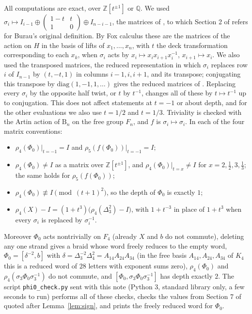 \documentclass[11pt]{amsart}
\theoremstyle{remark}
\newcommand{\B}{\mathrm{B}}
\newcommand{\at}{\big|_{t=-1}}
\begin{document}
All computations are exact, over $\mathbb{Z}[t^{\pm1}]$ or $\mathbb{Q}$. We used $\sigma_i\mapsto I_{i-1}\oplus\begin{pmatrix}1-t&t\\1&0\end{pmatrix}\oplus I_{n-i-1}$, the matrices of \cite[Section 4.2]{BB05}, to which Section 2 of \cite{BBB} refers for Burau's original definition. By Fox calculus these are the matrices of the action on $H$ in the basis of lifts of $x_1,\dots,x_n$, with $t$ the deck transformation corresponding to each $x_k$, when $\sigma_i$ acts by $x_i\mapsto x_ix_{i+1}x_i^{-1}$, $x_{i+1}\mapsto x_i$. We also used the transposed matrices, the reduced representation in which $\sigma_i$ replaces row $i$ of $I_{n-1}$ by $(t,-t,1)$ in columns $i-1,i,i+1$, and its transpose; conjugating this transpose by $\mathrm{diag}(1,-1,1,\dots)$ gives the reduced matrices of \cite[Section 4.2]{BB05}. Replacing every $\sigma_i$ by the opposite half twist, or $t$ by $t^{-1}$, changes all of these by $t\mapsto t^{-1}$ up to conjugation. This does not affect statements at $t=-1$ or about depth, and for the other evaluations we also use $t=1/2$ and $t=1/3$. Triviality is checked with the Artin action of $\B_n$ on the free group $F_n$, and $f$ is $\sigma_i\mapsto\sigma_i$. In each of the four matrix conventions:
\begin{itemize}
\item $\rho_4(\Phi_0)\at=I$ and $\rho_5(f(\Phi_0))\at=I$;
\item $\rho_4(\Phi_0)\neq I$ as a matrix over $\mathbb{Z}[t^{\pm1}]$, and $\rho_4(\Phi_0)|_{t=x}\neq I$ for $x=2,\tfrac12,3,\tfrac13$; the same holds for $\rho_5(f(\Phi_0))$;
\item $\rho_4(\Phi_0)\not\equiv I\pmod{(t+1)^2}$, so the depth of $\Phi_0$ is exactly $1$;
\item $\rho_4(X)-I=(1+t^3)\bigl(\rho_4(\Delta_3^2)-I\bigr)$, with $1+t^{-3}$ in place of $1+t^3$ when every $\sigma_i$ is replaced by $\sigma_i^{-1}$.
\end{itemize}
Moreover $\Phi_0$ acts nontrivially on $F_4$ (already $X$ and $b$ do not commute), deleting any one strand gives a braid whose word freely reduces to the empty word, $\Phi_0=[\delta^{-2},b]$ with $\delta=\Delta_3^{-2}\Delta_4^2=A_{14}A_{24}A_{34}$ (in the free basis $A_{14},A_{24},A_{34}$ of $K_4$ this is a reduced word of $28$ letters with exponent sums zero), $\rho_4(\Phi_0)$ and $\rho_4(\sigma_3\Phi_0\sigma_3^{-1})$ do not commute, and $[\Phi_0,\sigma_3\Phi_0\sigma_3^{-1}]$ has depth exactly $2$. The script \texttt{phi0\_check.py} sent with this note (Python 3, standard library only, a few seconds to run) performs all of these checks, checks the values from Section 7 of \cite{BBB} quoted after Lemma~\ref{lem:sign}, and prints the freely reduced word for $\Phi_0$.
\end{document}
